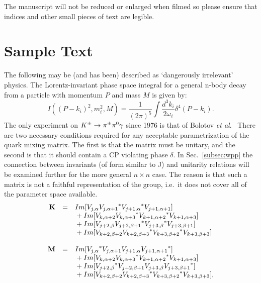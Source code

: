 The manuscript will not be reduced or enlarged when
filmed so please ensure that indices and other small
pieces of text are legible.

\section{Sample Text}
The following may be (and has been) described as
`dangerously irrelevant' physics. The Lorentz-invariant
phase space integral for a general n-body decay from a
particle with momentum $P$ and mass $M$ is given by:
\begin{equation}
I((P - k_i)^2, m^2_i, M) = \frac{1}{(2 \pi)^5}\!
\int\!\frac{d^3 k_i}{2 \omega_i} \! \delta^4(P - k_i).
\label{eq:murnf}
\end{equation}
The only experiment on $K^{\pm} \rightarrow \pi^{\pm} \pi^0
\gamma$ since 1976 is that of Bolotov {\it et  
al}.~\cite{bu} There are two necessary conditions
required for any acceptable parametrization of the quark 
mixing matrix. The first is that the matrix must be
unitary, and the second is that it should contain a CP
violating phase $\delta$. In Sec.~\ref{subsec:wpp} the
connection between invariants (of form similar to J) and
unitarity relations will be examined further for the
more general $ n \times n $ case. The reason is that
such a matrix is not a faithful representation of the
group, i.e.~it does not cover all of the parameter space
available.
\begin{equation}
\begin{array}{rcl}
\bf{K} & = &  Im[V_{j, \alpha} {V_{j,\alpha + 1}}^*
{V_{j + 1,\alpha}}^* V_{j + 1, \alpha + 1} ] \\
&&{}+ Im[V_{k, \alpha + 2} {V_{k,\alpha + 3}}^*
{V_{k + 1,\alpha + 2}}^* V_{k + 1, \alpha + 3} ]  \\
&&{}+ Im[V_{j + 2, \beta} {V_{j + 2,\beta + 1}}^*
{V_{j + 3,\beta}}^* V_{j + 3, \beta + 1} ]  \\
&&{}+ Im[V_{k + 2, \beta + 2} {V_{k + 2,\beta + 3}}^*
{V_{k + 3,\beta + 2}}^* V_{k + 3, \beta + 3}] \\
& & \\
\bf{M} & = &  Im[{V_{j, \alpha}}^* V_{j,\alpha + 1}
V_{j + 1,\alpha} {V_{j + 1, \alpha + 1}}^* ]  \\
&&{}+ Im[V_{k, \alpha + 2} {V_{k,\alpha + 3}}^*
{V_{k + 1,\alpha + 2}}^* V_{k + 1, \alpha + 3} ]  \\
&&{}+ Im[{V_{j + 2, \beta}}^* V_{j + 2,\beta + 1}
V_{j + 3,\beta} {V_{j + 3, \beta + 1}}^* ]  \\
&&{}+ Im[V_{k + 2, \beta + 2} {V_{k + 2,\beta + 3}}^*
{V_{k + 3,\beta + 2}}^* V_{k + 3, \beta + 3}],
\\ & &
\end{array}\label{eq:spa}
\end{equation}
